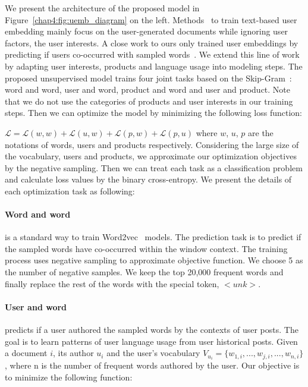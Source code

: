 We present the architecture of the proposed model in Figure~\ref{chap4:fig:uemb_diagram} on the left.
Methods~\cite{pan2019social} to train text-based user embedding mainly focus on the user-generated documents while ignoring user factors, the user interests. 
A close work to ours only trained user embeddings by predicting if users co-occurred with sampled words~\cite{amir2017quantifying}.
We extend this line of work by adapting user interests, products and language usage into modeling steps.
The proposed unsupervised model trains four joint tasks based on the Skip-Gram~\cite{mikolov2013distributed}: word and word, user and word, product and word and user and product. 
Note that we do not use the categories of products and user interests in our training steps.
Then we can optimize the model by minimizing the following loss function: 

$\mathcal{L} = \mathcal{L}(w, w) + \mathcal{L}(u, w) + \mathcal{L}(p, w) + \mathcal{L}(p, u)$
where $w$, $u$, $p$ are the notations of words, users and products respectively.
Considering the large size of the vocabulary, users and products, we approximate our optimization objectives by the negative sampling.
Then we can treat each task as a classification problem and calculate loss values by the binary cross-entropy.
We present the details of each optimization task as following:

\paragraph{Word and word}
is a standard way to train Word2vec~\cite{mikolov2013distributed} models. The prediction task is to predict if the sampled words have co-occurred within the window context. The training process uses negative sampling to approximate objective function. We choose 5 as the number of negative samples. We keep the top 20,000 frequent words and finally replace the rest of the words with the special token, $<unk>$. 


\paragraph{User and word}
predicts if a user authored the sampled words by the contexts of user posts. The goal is to learn patterns of user language usage from user historical posts. Given a document $i$, its author $u_i$ and the user's vocabulary $V_{u_i} = \{w_{1, i}, ..., w_{j, i}, ..., w_{n, i}\}$, where n is the number of frequent words authored by the user. Our objective is to minimize the following function:

